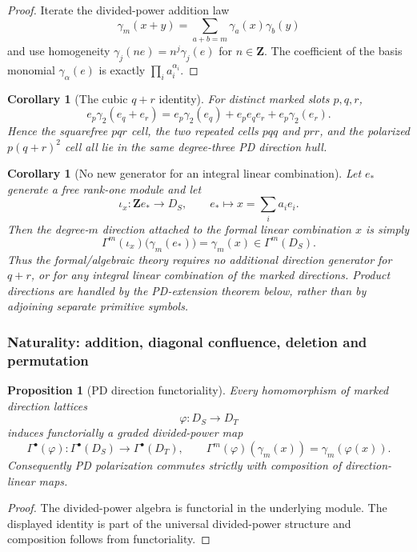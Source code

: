 \documentclass[11pt]{article}
\newtheorem{proposition}[theorem]{Proposition}
\newtheorem{corollary}[theorem]{Corollary}
\theoremstyle{remark}
\newcommand{\Z}{\mathbf Z}
\begin{document}
\begin{proof}
Iterate the divided-power addition law
\[
\gamma_m(x+y)=\sum_{a+b=m}\gamma_a(x)\gamma_b(y)
\]
and use homogeneity $\gamma_j(ne)=n^j\gamma_j(e)$ for $n\in\Z$. The coefficient of the basis monomial $\gamma_\alpha(e)$ is exactly $\prod_i a_i^{\alpha_i}$.
\end{proof}

\begin{corollary}[The cubic $q+r$ identity]\label{P1C-cor:pd-cubic-q-plus-r}
For distinct marked slots $p,q,r$,
\[
\boxed{
e_p\gamma_2(e_q+e_r)=e_p\gamma_2(e_q)+e_pe_qe_r+e_p\gamma_2(e_r).}
\]
Hence the squarefree $pqr$ cell, the two repeated cells $pqq$ and $prr$, and the polarized $p(q+r)^2$ cell all lie in the same degree-three PD direction hull.
\end{corollary}

\begin{corollary}[No new generator for an integral linear combination]\label{P1C-cor:no-new-linear-direction-generator}
Let $e_*$ generate a free rank-one module and let
\[
\iota_x:\Z e_*\longrightarrow D_S,
\qquad e_*\longmapsto x=\sum_i a_i e_i.
\]
Then the degree-$m$ direction attached to the formal linear combination $x$ is simply
\[
\Gamma^m(\iota_x)\bigl(\gamma_m(e_*)\bigr)=\gamma_m(x)\in\Gamma^m(D_S).
\]
Thus the formal/algebraic theory requires no additional direction generator for $q+r$, or for any integral linear combination of the marked directions.  Product directions are handled by the PD-extension theorem below, rather than by adjoining separate primitive symbols.
\end{corollary}

\subsubsection{Naturality: addition, diagonal confluence, deletion and permutation}

\begin{proposition}[PD direction functoriality]\label{P1C-thm:pd-direction-functoriality}
Every homomorphism of marked direction lattices
\[
\varphi:D_S\longrightarrow D_T
\]
induces functorially a graded divided-power map
\[
\Gamma^\bullet(\varphi):\Gamma^\bullet(D_S)\longrightarrow\Gamma^\bullet(D_T),
\qquad
\Gamma^m(\varphi)(\gamma_m(x))=\gamma_m(\varphi(x)).
\]
Consequently PD polarization commutes strictly with composition of direction-linear maps.
\end{proposition}

\begin{proof}
The divided-power algebra is functorial in the underlying module. The displayed identity is part of the universal divided-power structure and composition follows from functoriality.
\end{proof}
\end{document}
